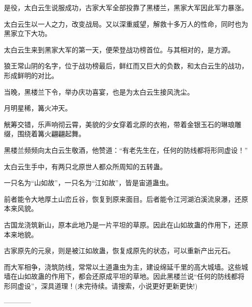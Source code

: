 \begin{this_body}
是役，太白云生说服成功，古家大军全部投靠了黑楼兰，黑家大军因此军力暴涨。

太白云生以一人之力，改变战局。又以深重威望，解救十多万人的性命，同时也为黑家立下大功。

太白云生来到黑家大军的第一天，便荣登战功榜首位。与其相对的，是方源。

狼王常山阴的名字，位于战功榜最后，鲜红而又巨大的负数，和太白云生的战功，形成鲜明的对比。

当晚，黑楼兰下令，举办庆功喜宴，也是为太白云生接风洗尘。

月明星稀，篝火冲天。

觥筹交错，乐声响彻云霄，美貌的少女穿着北原的衣袍，带着金银玉石的琳琅雕缀，围绕着篝火翩翩起舞。

黑楼兰频频向太白云生敬酒，他赞道：“有老先生在，任何的防线都将形同虚设！”

太白云生手中，有两只北原世人都众所周知的五转蛊。

一只名为“山如故”，一只名为“江如故”，皆是宙道蛊虫。

前者能令大地厚土山峦丘谷，恢复到原来面目。后者能令江河湖泊溪流泉瀑，还原本来风貌。

古国龙浇筑新山，原本此地乃是一片平坦的草原。因此在山如故蛊的作用下，还原本来地貌。

古家原先的元泉，则是被江如故蛊，恢复成原先的状态，可以重新产出元石。

而大军相争，浇筑防线，常常以土道蛊虫为主，建设绵延千里的高大城墙。这些城墙在山如故蛊的作用下，都会还原成平坦的草地。因此黑楼兰说“任何的防线都将形同虚设”，深具道理！(未完待续。请搜索，小说更好更新更快!)

------------

\end{this_body}

